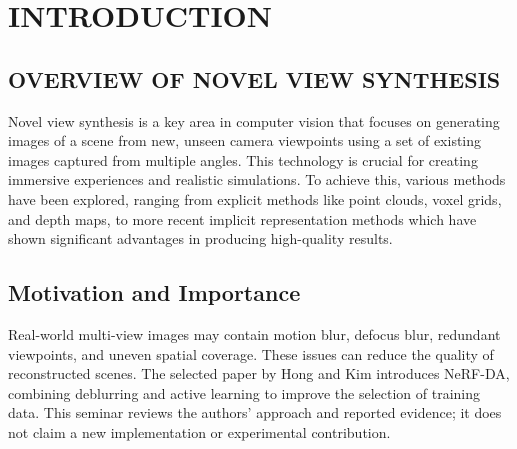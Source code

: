 \chapter{\MakeUppercase{Introduction}}
\setcounter{equation}{0}

\section{\MakeUppercase{Overview of Novel View Synthesis}}

Novel view synthesis is a key area in computer vision that focuses on generating images of a scene from new, unseen camera viewpoints using a set of existing images captured from multiple angles. This technology is crucial for creating immersive experiences and realistic simulations. To achieve this, various methods have been explored, ranging from explicit methods like point clouds, voxel grids, and depth maps, to more recent implicit representation methods which have shown significant advantages in producing high-quality results.\cite{bib5}


\section{Motivation and Importance}
Real-world multi-view images may contain motion blur, defocus blur, redundant viewpoints, and uneven spatial coverage. These issues can reduce the quality of reconstructed scenes. The selected paper by Hong and Kim introduces NeRF-DA, combining deblurring and active learning to improve the selection of training data. This seminar reviews the authors' approach and reported evidence; it does not claim a new implementation or experimental contribution.\cite{bib1}
